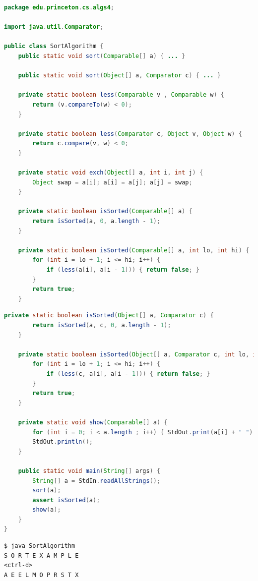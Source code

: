 \documentclass[8pt,a4paper,compress]{beamer}
\begin{document}
\begin{frame}[fragile]
\pause

\begin{lstlisting}[language=Java]
package edu.princeton.cs.algs4;

import java.util.Comparator;

public class SortAlgorithm {
    public static void sort(Comparable[] a) { ... }
    
    public static void sort(Object[] a, Comparator c) { ... }

    private static boolean less(Comparable v , Comparable w) {
        return (v.compareTo(w) < 0);
    }

    private static boolean less(Comparator c, Object v, Object w) {
        return c.compare(v, w) < 0;
    }
        
    private static void exch(Object[] a, int i, int j) {
        Object swap = a[i]; a[i] = a[j]; a[j] = swap;
    }
    
    private static boolean isSorted(Comparable[] a) {
        return isSorted(a, 0, a.length - 1);
    }

    private static boolean isSorted(Comparable[] a, int lo, int hi) {
        for (int i = lo + 1; i <= hi; i++) {
            if (less(a[i], a[i - 1])) { return false; }
        }
        return true;
    }
\end{lstlisting}
\end{frame}

\begin{frame}[fragile]
\pause

\begin{lstlisting}[language=Java]
    private static boolean isSorted(Object[] a, Comparator c) {
        return isSorted(a, c, 0, a.length - 1);
    }

    private static boolean isSorted(Object[] a, Comparator c, int lo, int hi) {
        for (int i = lo + 1; i <= hi; i++) {
            if (less(c, a[i], a[i - 1])) { return false; }
        }
        return true;
    }
    
    private static void show(Comparable[] a) {
        for (int i = 0; i < a.length ; i++) { StdOut.print(a[i] + " "); }
        StdOut.println();
    }
    
    public static void main(String[] args) {
        String[] a = StdIn.readAllStrings();
        sort(a);
        assert isSorted(a);
        show(a);
    }
}
\end{lstlisting}

\pause

\begin{lstlisting}[language={}]
$ java SortAlgorithm
S O R T E X A M P L E
<ctrl-d>
A E E L M O P R S T X
\end{lstlisting}
\end{frame}
\end{document}
